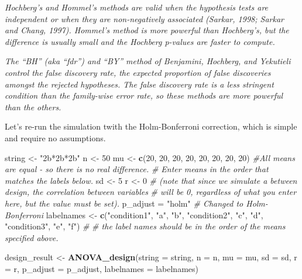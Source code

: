 \documentclass[]{article}
\newenvironment{Shaded}{\begin{snugshade}}{\end{snugshade}}
\newcommand{\KeywordTok}[1]{\textcolor[rgb]{0.13,0.29,0.53}{\textbf{#1}}}
\newcommand{\DataTypeTok}[1]{\textcolor[rgb]{0.13,0.29,0.53}{#1}}
\newcommand{\DecValTok}[1]{\textcolor[rgb]{0.00,0.00,0.81}{#1}}
\newcommand{\StringTok}[1]{\textcolor[rgb]{0.31,0.60,0.02}{#1}}
\newcommand{\CommentTok}[1]{\textcolor[rgb]{0.56,0.35,0.01}{\textit{#1}}}
\newcommand{\NormalTok}[1]{#1}
\begin{document}
\emph{Hochberg's and Hommel's methods are valid when the hypothesis
tests are independent or when they are non-negatively associated
(Sarkar, 1998; Sarkar and Chang, 1997). Hommel's method is more powerful
than Hochberg's, but the difference is usually small and the Hochberg
p-values are faster to compute.}

\emph{The ``BH'' (aka ``fdr'') and ``BY'' method of Benjamini, Hochberg,
and Yekutieli control the false discovery rate, the expected proportion
of false discoveries amongst the rejected hypotheses. The false
discovery rate is a less stringent condition than the family-wise error
rate, so these methods are more powerful than the others.}

Let's re-run the simulation twith the Holm-Bonferroni correction, which
is simple and require no assumptions.

\begin{Shaded}
\begin{Highlighting}[]
\NormalTok{string <-}\StringTok{ "2b*2b*2b"}
\NormalTok{n <-}\StringTok{ }\DecValTok{50}
\NormalTok{mu <-}\StringTok{ }\KeywordTok{c}\NormalTok{(}\DecValTok{20}\NormalTok{, }\DecValTok{20}\NormalTok{, }\DecValTok{20}\NormalTok{, }\DecValTok{20}\NormalTok{, }\DecValTok{20}\NormalTok{, }\DecValTok{20}\NormalTok{, }\DecValTok{20}\NormalTok{, }\DecValTok{20}\NormalTok{) }\CommentTok{#All means are equal - so there is no real difference.}
\CommentTok{# Enter means in the order that matches the labels below.}
\NormalTok{sd <-}\StringTok{ }\DecValTok{5}
\NormalTok{r <-}\StringTok{ }\DecValTok{0} 
\CommentTok{# (note that since we simulate a between design, the correlation between variables }
\CommentTok{# will be 0, regardless of what you enter here, but the value must be set).}
\NormalTok{p_adjust =}\StringTok{ "holm"}
\CommentTok{# Changed to Holm-Bonferroni}
\NormalTok{labelnames <-}\StringTok{ }\KeywordTok{c}\NormalTok{(}\StringTok{"condition1"}\NormalTok{, }\StringTok{"a"}\NormalTok{, }\StringTok{"b"}\NormalTok{, }\StringTok{"condition2"}\NormalTok{, }\StringTok{"c"}\NormalTok{, }\StringTok{"d"}\NormalTok{, }\StringTok{"condition3"}\NormalTok{, }\StringTok{"e"}\NormalTok{, }\StringTok{"f"}\NormalTok{) }\CommentTok{#}
\CommentTok{# the label names should be in the order of the means specified above.}

\NormalTok{design_result <-}\StringTok{ }\KeywordTok{ANOVA_design}\NormalTok{(}\DataTypeTok{string =}\NormalTok{ string,}
                   \DataTypeTok{n =}\NormalTok{ n, }
                   \DataTypeTok{mu =}\NormalTok{ mu, }
                   \DataTypeTok{sd =}\NormalTok{ sd, }
                   \DataTypeTok{r =}\NormalTok{ r, }
                   \DataTypeTok{p_adjust =}\NormalTok{ p_adjust,}
                   \DataTypeTok{labelnames =}\NormalTok{ labelnames)}
\end{Highlighting}
\end{Shaded}
\end{document}
